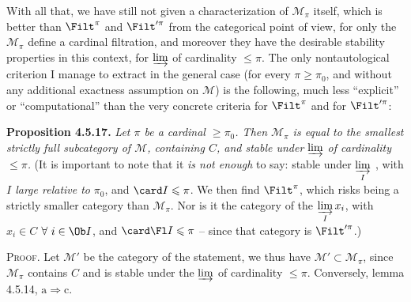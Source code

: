 With all that, we have still not given a characterization of $\mathcal{M}_{\pi}$ itself, which is better than $\Filt^{\pi}$ and $\Filt'^{\pi}$ from the categorical point of view, for only the $\mathcal{M}_{\pi}$ define a cardinal filtration, and moreover they have the desirable stability properties in this
context, for $\varinjlim$ of cardinality $\leqslant \pi$. The only nontautological criterion I manage to extract in the general case (for every $\pi \geqslant \pi_0$, and without any additional exactness assumption on $\mathcal{M}$) is the following, much less ``explicit'' or ``computational'' than the very concrete criteria for $\Filt^{\pi}$ and for $\Filt'^{\pi}$:

\textbf{Proposition 4.5.17.} \textit{Let $\pi$ be a cardinal $\geqslant \pi_0$. Then $\mathcal{M}_{\pi}$ is equal to the smallest strictly full subcategory of $\mathcal{M}$, containing $C$, and stable under} $\varinjlim$ \textit{of cardinality $\leqslant \pi$.} (It is important to note that it \textit{is not enough} to say: stable under $\varinjlim\limits_{I}$ , with \textit{$I$ large relative to} $\pi_0$, and $\card I \leqslant \pi$. We then find $\Filt^{\pi}$, which risks being a strictly smaller category than $\mathcal{M}_{\pi}$. Nor is it the category of the $\varinjlim\limits_{I} x_i$, with $x_i \in C$ $\forall\ i \in \Ob I$, and $\card \Fl I \leqslant \pi$ -- since that category is $\Filt'^{\pi}$.)

\textsc{Proof}. Let $\mathcal{M}'$ be the category of the statement, we thus have $\mathcal{M}' \subset \mathcal{M}_{\pi}$, since $\mathcal{M}_{\pi}$ contains $C$ and is stable under the $\varinjlim$ of cardinality $\leqslant \pi$. Conversely, lemma 4.5.14, $\mathrm{a} \Longrightarrow \mathrm{c}$.

